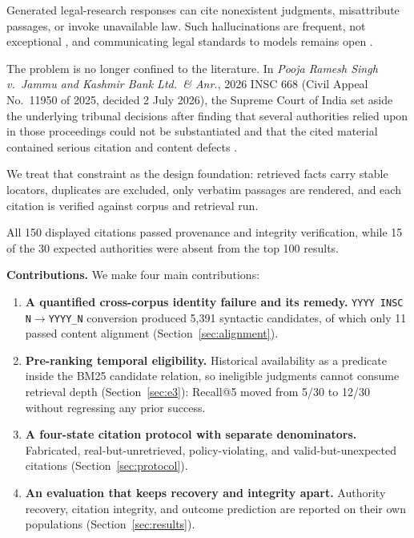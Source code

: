 \documentclass[conference]{IEEEtran}
\begin{document}
Generated legal-research responses can cite nonexistent judgments, misattribute passages, or invoke unavailable law. Such hallucinations are frequent, not exceptional
\cite{dahl2024}, and communicating legal standards to models remains open
\cite{nay2023}.

The problem is no longer confined to the literature. In \emph{Pooja Ramesh Singh
v.\ Jammu and Kashmir Bank Ltd.\ \& Anr.}, 2026 INSC 668 (Civil Appeal
No.\ 11950 of 2025, decided 2 July 2026), the Supreme Court of
India set aside the underlying tribunal decisions after finding that several
authorities relied upon in those proceedings could not be substantiated
and that the cited material contained serious citation and content defects \cite{poojasingh2026}.

We treat that constraint as the design foundation:
retrieved facts carry stable
locators, duplicates are excluded, only verbatim passages are rendered,
and each citation is verified against corpus and retrieval run.

All 150 displayed citations passed provenance and integrity verification, while 15 of the 30 expected authorities were absent from the top 100 results.

\textbf{Contributions.} We make four main contributions:

\begin{enumerate}
\item \textbf{A quantified cross-corpus identity failure and its remedy.}
\texttt{YYYY INSC N}$\rightarrow$\texttt{YYYY\_N} conversion produced 5{,}391 syntactic candidates, of which only 11 passed
content alignment (Section~\ref{sec:alignment}).

\item \textbf{Pre-ranking temporal eligibility.} Historical
availability as a predicate inside the BM25 candidate relation, so ineligible judgments cannot consume retrieval depth
(Section~\ref{sec:e3}): Recall@5 moved
from 5/30 to 12/30 without regressing any prior success.

\item \textbf{A four-state citation protocol with separate denominators.}
Fabricated, real-but-unretrieved, policy-violating, and valid-but-unexpected
citations (Section~\ref{sec:protocol}).

\item \textbf{An evaluation that keeps recovery and integrity apart.} Authority
recovery, citation integrity, and outcome prediction are reported on their own populations
(Section~\ref{sec:results}).
\end{enumerate}
\end{document}
